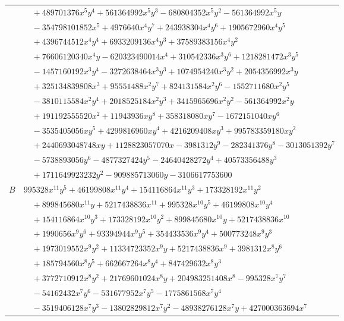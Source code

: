 \documentclass[11pt]{article}
\begin{document}
\begin{longtable}{@{}ll@{}}
 & $\quad +489701376x^{5}y^{4}+561364992x^{5}y^{3}-680804352x^{5}y^{2}-561364992x^{5}y$\\
 & $\quad -354798101852x^{5}+4976640x^{4}y^{7}+243938304x^{4}y^{6}+1905672960x^{4}y^{5}$\\
 & $\quad +4396744512x^{4}y^{4}+6933209136x^{4}y^{3}+37589383156x^{4}y^{2}$\\
 & $\quad +76606120340x^{4}y-620323490014x^{4}+310542336x^{3}y^{6}+1218281472x^{3}y^{5}$\\
 & $\quad -1457160192x^{3}y^{4}-3272638464x^{3}y^{3}+1074954240x^{3}y^{2}+2054356992x^{3}y$\\
 & $\quad +325134839808x^{3}+95551488x^{2}y^{7}+824131584x^{2}y^{6}-1552711680x^{2}y^{5}$\\
 & $\quad -3810115584x^{2}y^{4}+2018525184x^{2}y^{3}+3415965696x^{2}y^{2}-561364992x^{2}y$\\
 & $\quad +191192555520x^{2}+11943936xy^{8}+358318080xy^{7}-1672151040xy^{6}$\\
 & $\quad -3535405056xy^{5}+4299816960xy^{4}+4216209408xy^{3}+995783359180xy^{2}$\\
 & $\quad +2440693048748xy+1128823057070x-3981312y^{9}-282341376y^{8}-3013051392y^{7}$\\
 & $\quad -5738893056y^{6}-4877327424y^{5}-24640428272y^{4}+40573356488y^{3}$\\
 & $\quad +1711649923232y^{2}-909885713060y-3106617753600$\\
$B$ & $995328x^{11}y^{5}+46199808x^{11}y^{4}+154116864x^{11}y^{3}+173328192x^{11}y^{2}$\\
 & $\quad +899845680x^{11}y+5217438836x^{11}+995328x^{10}y^{5}+46199808x^{10}y^{4}$\\
 & $\quad +154116864x^{10}y^{3}+173328192x^{10}y^{2}+899845680x^{10}y+5217438836x^{10}$\\
 & $\quad +1990656x^{9}y^{6}+93394944x^{9}y^{5}+354433536x^{9}y^{4}+500773248x^{9}y^{3}$\\
 & $\quad +1973019552x^{9}y^{2}+11334723352x^{9}y+5217438836x^{9}+3981312x^{8}y^{6}$\\
 & $\quad +185794560x^{8}y^{5}+662667264x^{8}y^{4}+847429632x^{8}y^{3}$\\
 & $\quad +3772710912x^{8}y^{2}+21769601024x^{8}y+204983251408x^{8}-995328x^{7}y^{7}$\\
 & $\quad -54162432x^{7}y^{6}-531677952x^{7}y^{5}-1775861568x^{7}y^{4}$\\
 & $\quad -3519406128x^{7}y^{3}-13802829812x^{7}y^{2}-48938276128x^{7}y+427000363694x^{7}$\\

\end{longtable}
\end{document}
